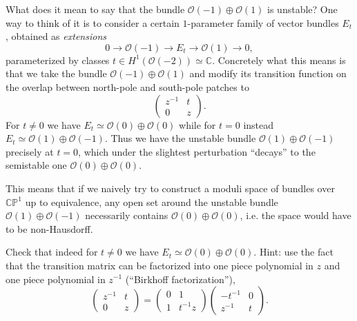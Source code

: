 \documentclass[12pt,letterpaper,reqno]{article}
\numberwithin{equation}{section}
\newcommand{\cO}{\ensuremath{\mathcal O}}
\newcommand{\C}{\ensuremath{\mathbb C}}
\newcommand{\PP}{\ensuremath{\mathbb P}}
\newcommand{\ti}[1]{\textit{#1}}
\begin{document}
\begin{example}[Instability of $\cO(-1) \oplus \cO(1)$]
What does it mean to say that the bundle $\cO(-1) \oplus \cO(1)$
is unstable? One way to think of it is to consider a certain
$1$-parameter family of vector bundles $E_t$, obtained
as \ti{extensions}
\begin{equation}
  0 \to \cO(-1) \to E_t \to \cO(1) \to 0,
\end{equation}
parameterized by classes $t \in H^1(\cO(-2)) \simeq \C$.
Concretely what this means is that we take the bundle
$\cO(-1) \oplus \cO(1)$ and modify its transition function
on the overlap between north-pole and south-pole patches
to
\begin{equation}
  \begin{pmatrix} z^{-1} & t \\ 0 & z \end{pmatrix}.
\end{equation}
For $t \neq 0$ we have $E_t \simeq \cO(0) \oplus \cO(0)$
while for $t = 0$ instead $E_t \simeq \cO(1) \oplus \cO(-1)$.
Thus we have the unstable bundle 
$\cO(1) \oplus \cO(-1)$
precisely at $t = 0$, which under the 
slightest perturbation ``decays'' to the semistable one
$\cO(0) \oplus \cO(0)$.

This means that if we naively try to construct a moduli space of bundles
over $\C\PP^1$ up to equivalence, any open set around the unstable
bundle $\cO(1) \oplus \cO(-1)$ necessarily contains $\cO(0) \oplus \cO(0)$,
i.e. the space would have to be non-Hausdorff.
\end{example}

\begin{exercise}
Check that indeed for $t \neq 0$ we have $E_t \simeq \cO(0) \oplus \cO(0)$.
Hint: use the fact that the transition matrix can be factorized into
one piece polynomial in $z$ and one piece polynomial in $z^{-1}$ 
(``Birkhoff factorization''),
\begin{equation}
   \begin{pmatrix} z^{-1} & t \\ 0 & z \end{pmatrix} = \begin{pmatrix} 0 & 1 \\ 1 & t^{-1}z \end{pmatrix} \begin{pmatrix} -t^{-1} & 0 \\ z^{-1} & t \end{pmatrix}.
\end{equation} 
\end{exercise}
\end{document}
